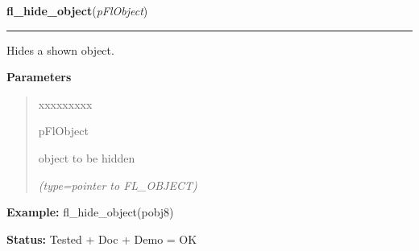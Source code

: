 \hspace{.8\funcindent}\begin{boxedminipage}{\funcwidth}

    \raggedright \textbf{fl\_hide\_object}(\textit{pFlObject})

    \vspace{-1.5ex}

    \rule{\textwidth}{0.5\fboxrule}
\setlength{\parskip}{2ex}
    Hides a shown object.

\setlength{\parskip}{1ex}
      \textbf{Parameters}
      \vspace{-1ex}

      \begin{quote}
        \begin{Ventry}{xxxxxxxxx}

          \item[pFlObject]

          object to be hidden

            {\it (type=pointer to FL\_OBJECT)}

        \end{Ventry}

      \end{quote}

\textbf{Example:} fl\_hide\_object(pobj8)



\textbf{Status:} Tested + Doc + Demo = OK



    \end{boxedminipage}

    \label{xformslib:flbasic:fl_object_is_visible}

    \vspace{0.5ex}

